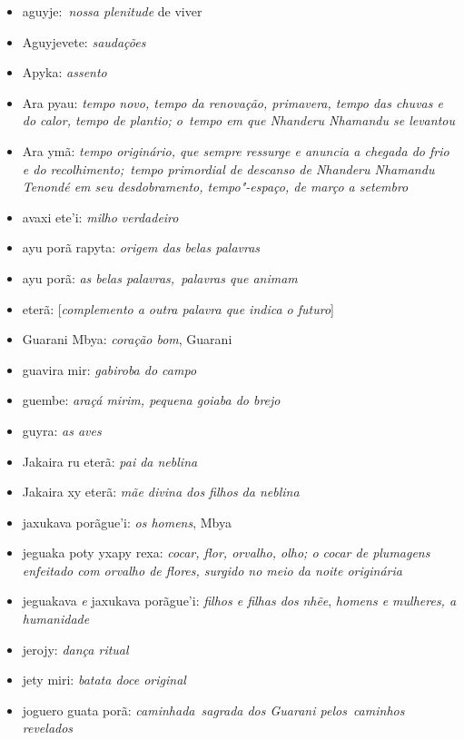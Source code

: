  

\begin{itemize}
\itemsep1pt\parskip0pt
\item
  aguyje:~\emph{nossa plenitude} de viver
\item
  Aguyjevete: \emph{saudações}
\item
  Apyka: \emph{assento}
\item
  Ara pyau: \emph{tempo novo, tempo da renovação, primavera, tempo das
  chuvas e do calor, tempo de plantio; o}~\emph{tempo em que Nhanderu
  Nhamandu se levantou}
\item
  Ara ymã: \emph{tempo originário, que sempre ressurge e anuncia a
  chegada do frio e do recolhimento;}~\emph{tempo primordial de descanso
  de Nhanderu Nhamandu Tenondé em seu desdobramento, tempo"-espaço, de
  março a setembro}~
\item
  avaxi ete'i: \emph{milho verdadeiro}
\item
  ayu porã rapyta: \emph{origem das belas palavras}
\item
  ayu porã: \emph{as belas palavras,}~\emph{palavras que animam}
\item
  eterã: [\emph{complemento a outra palavra que indica o futuro}]
\item
  Guarani Mbya: \emph{coração bom}, Guarani
\item
  guavira mir: \emph{gabiroba do campo}
\item
  guembe: \emph{araçá mirim, pequena goiaba do brejo}
\item
  guyra: \emph{as aves}
\item
  Jakaira ru eterã: \emph{pai da neblina}
\item
  Jakaira xy eterã: \emph{mãe divina dos filhos da neblina}
\item
  jaxukava porãgue'i: \emph{os homens}, Mbya
\item
  jeguaka poty yxapy rexa: \emph{cocar, flor, orvalho, olho; o cocar de
  plumagens enfeitado com orvalho de flores, surgido no meio da noite
  originária}
\item
  jeguakava \emph{e} jaxukava porãgue'i: \emph{filhos e filhas dos}
  \emph{nhẽe}, \emph{homens e mulheres, a humanidade}
\item
  jerojy: \emph{dança ritual}
\item
  jety miri: \emph{batata doce original}
\item
  joguero guata porã: \emph{caminhada}~\emph{sagrada dos Guarani
  pelos}~\emph{caminhos revelados}~

\end{itemize}
